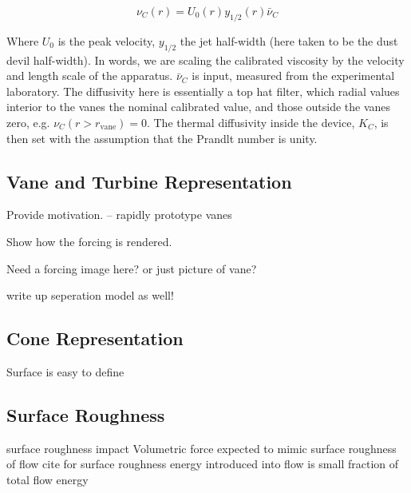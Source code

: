 \begin{equation}
 \nu_C(r) = U_0(r) y_{1/2}(r) \bar \nu_C
\end{equation}

Where $U_0$ is the peak velocity, $y_{1/2}$ the jet half-width (here
taken to be the dust devil half-width). In words, we are scaling the
calibrated viscosity by the velocity and length scale of the
apparatus. $\bar \nu_C $ is input, measured from the experimental
laboratory.  The diffusivity here is essentially a top hat filter, which
radial values interior to the vanes the nominal calibrated value, and
those outside the vanes zero, e.g. $\nu_C(r>r_{\text{vane}})=0$. The
thermal diffusivity inside the device, $K_C$, is then set with the
assumption that the Prandlt number is unity.  

\subsection{Vane and Turbine Representation}

Provide motivation. -- rapidly prototype vanes

Show how the forcing is rendered. 

Need a forcing image here? or just picture of vane?

write up seperation model as well!

\subsection{Cone Representation}
Surface is easy to define

\subsection{Surface Roughness}

surface roughness impact\cite{oke1987boundary}
Volumetric force
expected to mimic surface roughness of flow
cite for surface roughness
energy introduced into flow is small fraction of total flow energy


